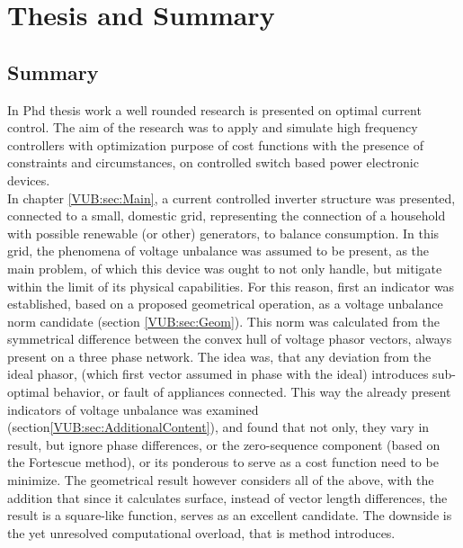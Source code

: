 \chapter{Thesis and Summary}

\section{Summary}

In Phd thesis work a well rounded research is presented on optimal current control. The aim of the research was to apply and simulate high frequency controllers with optimization purpose of cost functions with the presence of constraints and circumstances, on controlled switch based power electronic devices.\\
In chapter \ref{VUB:sec:Main}, a current controlled inverter structure was presented, connected to a small, domestic grid, representing the connection of a household with possible renewable (or other) generators, to balance consumption. In this grid, the phenomena of voltage unbalance was assumed to be present, as the main problem, of which this device was ought to not only handle, but mitigate within the limit of its physical capabilities. For this reason, first an indicator was established, based on a proposed geometrical operation, as a voltage unbalance norm candidate (section \ref{VUB:sec:Geom}). This norm was calculated from the symmetrical difference between the convex hull of voltage phasor vectors, always present on a three phase network. The idea was, that any deviation from the ideal phasor, (which first vector assumed in phase with the ideal) introduces sub-optimal behavior, or fault of appliances connected. This way the already present indicators of voltage unbalance was examined (section\ref{VUB:sec:AdditionalContent}), and found that not only, they vary in result, but ignore phase differences, or the zero-sequence component (based on the Fortescue method), or its ponderous to serve as a cost function need to be minimize. The geometrical result however considers all of the above, with the addition that since it calculates surface, instead of vector length differences, the result is a square-like function, serves as an excellent candidate. The downside is the yet unresolved computational overload, that is method introduces.\\
